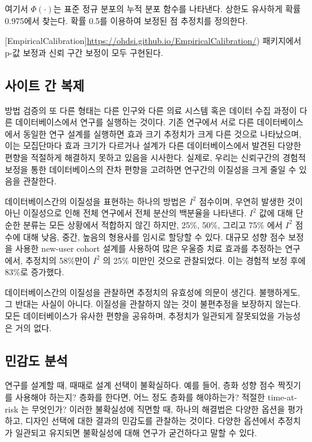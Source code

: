 \documentclass[11pt]{book}
\theoremstyle{definition}
\theoremstyle{definition}
\theoremstyle{definition}
\theoremstyle{remark}
\let\BeginKnitrBlock\begin \let\EndKnitrBlock\end
\begin{document}
여기서 \(\Phi(\cdot)\)는 표준 정규 분포의 누적 분포 함수를 나타낸다.
상한도 유사하게 확률 0.975에서 찾는다. 확률 0.5를 이용하여 보정된 점
추정치를 정의한다.

{[}EmpiricalCalibration{]}\url{https://ohdsi.github.io/EmpiricalCalibration/})
패키지에서 p-값 보정과 신뢰 구간 보정이 모두 구현된다.

\subsection{사이트 간 복제}\label{--}


방법 검증의 또 다른 형태는 다른 인구와 다른 의료 시스템 혹은 데이터 수집
과정이 다른 데이터베이스에서 연구를 실행하는 것이다. 기존 연구에서 서로
다른 데이터베이스에서 동일한 연구 설계를 실행하면 효과 크기 추정치가
크게 다른 것으로 나타났으며, \citep{madigan_2013} 이는 모집단마다 효과
크기가 다르거나 설계가 다른 데이터베이스에서 발견된 다양한 편향을
적절하게 해결하지 못하고 있음을 시사한다. 실제로, 우리는 신뢰구간의
경험적 보정을 통한 데이터베이스의 잔차 편향을 고려하면 연구간의 이질성을
크게 줄일 수 있음을 관찰한다. \citep{schuemie_2018}

데이터베이스간의 이질성을 표현하는 하나의 방법은 \(I^2\) 점수이며,
우연히 발생한 것이 아닌 이질성으로 인해 전체 연구에서 전체 분산의
백분율을 나타낸다. \citep{higgins_2003} \(I^2\) 값에 대해 단순한 분류는
모든 상황에서 적합하지 않긴 하지만, 25\%, 50\%, 그리고 75\% 에서 \(I^2\)
점수에 대해 낮음, 중간, 높음의 형용사를 임시로 할당할 수 있다. 대규모
성향 점수 보정을 사용한 new-user cohort 설계를 사용하여 많은 우울증 치료
효과를 추정하는 연구에서, \citep{schuemie_2018b} 추정치의 58\%만이
\(I^2\) 의 25\% 미만인 것으로 관찰되었다. 이는 경험적 보정 후에 83\%로
증가했다.

\BeginKnitrBlock{rmdimportant}
데이터베이스간의 이질성을 관찰하면 추정치의 유효성에 의문이 생긴다.
불행하게도, 그 반대는 사실이 아니다. 이질성을 관찰하지 않는 것이
불편추정을 보장하지 않는다. 모든 데이터베이스가 유사한 편향을 공유하며,
추정치가 일관되게 잘못되었을 가능성은 거의 없다.
\EndKnitrBlock{rmdimportant}

\subsection{민감도 분석}\label{-}


연구를 설계할 때, 때때로 설계 선택이 불확실하다. 예를 들어, 층화 성향
점수 짝짓기를 사용해야 하는지? 층화를 한다면, 어느 정도 층화를
해야하는가? 적절한 time-at-risk 는 무엇인가? 이러한 불확실성에 직면할
때, 하나의 해결법은 다양한 옵션을 평가하고, 디자인 선택에 대한 결과의
민감도를 관찰하는 것이다. 다양한 옵션에서 추정치가 일관되고 유지되면
불확실성에 대해 연구가 굳건하다고 말할 수 있다.
\end{document}

